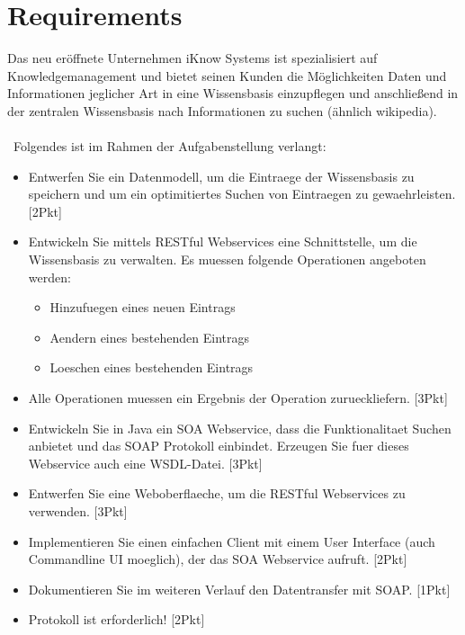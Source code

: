 \documentclass[11pt, a4paper]{article}
\begin{document}
\section{Requirements}

Das neu eröffnete Unternehmen iKnow Systems ist spezialisiert auf
Knowledgemanagement und bietet seinen Kunden die Möglichkeiten Daten und
Informationen jeglicher Art in eine Wissensbasis einzupflegen und anschließend
in der zentralen Wissensbasis nach Informationen zu suchen (ähnlich wikipedia).
\\\\\
Folgendes ist im Rahmen der Aufgabenstellung verlangt:

\begin{itemize}
	
	\item Entwerfen Sie ein Datenmodell, um die Eintraege der Wissensbasis zu speichern und um ein optimitiertes Suchen von Eintraegen zu gewaehrleisten. [2Pkt]

	\item Entwickeln Sie mittels RESTful Webservices eine Schnittstelle, um die Wissensbasis zu verwalten. Es muessen folgende Operationen angeboten werden: 
	
	\begin{itemize}
		\item Hinzufuegen eines neuen Eintrags
		\item Aendern eines bestehenden Eintrags
		\item Loeschen eines bestehenden Eintrags
	\end{itemize}
	
	\item Alle Operationen muessen ein Ergebnis der Operation zurueckliefern. [3Pkt]

	\item Entwickeln Sie in Java ein SOA Webservice, dass die Funktionalitaet Suchen anbietet und das SOAP Protokoll einbindet. Erzeugen Sie fuer dieses Webservice auch eine WSDL-Datei. [3Pkt]

	\item Entwerfen Sie eine Weboberflaeche, um die RESTful Webservices zu verwenden. [3Pkt]

	\item Implementieren Sie einen einfachen Client mit einem User Interface (auch Commandline UI moeglich), der das SOA Webservice aufruft. [2Pkt]

	\item Dokumentieren Sie im weiteren Verlauf den Datentransfer mit SOAP. [1Pkt]

	\item Protokoll ist erforderlich! [2Pkt] 
	
\end{itemize}
\end{document}
